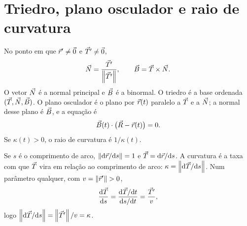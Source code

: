 \documentclass[11pt,a4paper]{article}
\begin{document}

\section{Triedro, plano osculador e raio de curvatura}

\begin{definicao}
No ponto em que \(\vec{r}'\neq\vec{0}\) e \(\vec{T}'\neq\vec{0}\),
\[
\vec{N}=\frac{\vec{T}'}{\left\lVert \vec{T}' \right\rVert},
\qquad
\vec{B}=\vec{T}\times\vec{N}.
\]
O vetor \(\vec{N}\) é a normal principal e \(\vec{B}\) é a binormal. O triedro é a base ordenada \((\vec{T},\vec{N},\vec{B})\). O plano osculador é o plano por \(\vec{r}(t)\) paralelo a \(\vec{T}\) e a \(\vec{N}\); a normal desse plano é \(\vec{B}\), e a equação é
\[
\vec{B}(t)\cdot\bigl(\vec{R}-\vec{r}(t)\bigr)=0.
\]
Se \(\kappa(t)>0\), o raio de curvatura é \(1/\kappa(t)\).
\end{definicao}

\begin{intuicao}
Se \(s\) é o comprimento de arco, \(\left\lVert \mathrm{d}\vec{r}/\mathrm{d} s \right\rVert=1\) e \(\vec{T}=\mathrm{d}\vec{r}/\mathrm{d} s\). A curvatura é a taxa com que \(\vec{T}\) vira em relação ao comprimento de arco: \(\kappa=\left\lVert \mathrm{d}\vec{T}/\mathrm{d} s \right\rVert\). Num parâmetro qualquer, com \(v=\left\lVert \vec{r}' \right\rVert>0\),
\[
\frac{\mathrm{d}\vec{T}}{\mathrm{d} s}
=\frac{\mathrm{d}\vec{T}/\mathrm{d} t}{\mathrm{d} s/\mathrm{d} t}
=\frac{\vec{T}'}{v},
\]
logo \(\left\lVert \mathrm{d}\vec{T}/\mathrm{d} s \right\rVert=\left\lVert \vec{T}' \right\rVert/v=\kappa\).
\end{intuicao}
\end{document}
